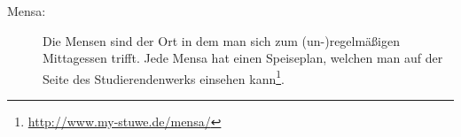 \begin{description}
\item[Mensa:] Die Mensen sind der Ort in dem man sich zum (un-)regelmäßigen Mittagessen trifft. Jede Mensa hat einen Speiseplan, welchen man auf der Seite des Studierendenwerks einsehen kann\footnote{\url{http://www.my-stuwe.de/mensa/}}.	%

\vfill


\pagebreak
%
%
\end{description}

